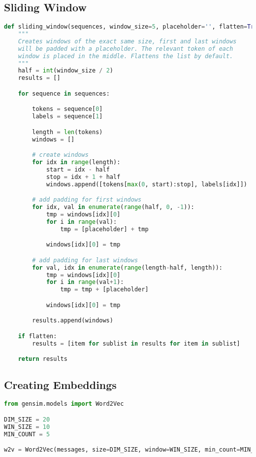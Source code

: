 \subsection{Sliding Window}

\begin{lstlisting}[language=Python, label={code:sliding-window}, caption=Sliding window implementation]
def sliding_window(sequences, window_size=5, placeholder='', flatten=True):
    """
    Creates windows of the exact same size, first and last windows
    will be padded with a placeholder. The relevant token of each
    window is placed in the middle. Flattens the list by default.
    """
    half = int(window_size / 2)
    results = []

    for sequence in sequences:

        tokens = sequence[0]
        labels = sequence[1]

        length = len(tokens)
        windows = []

        # create windows
        for idx in range(length):
            start = idx - half
            stop = idx + 1 + half
            windows.append([tokens[max(0, start):stop], labels[idx]])

        # add padding for first windows
        for idx, val in enumerate(range(half, 0, -1)):
            tmp = windows[idx][0]
            for i in range(val):
                tmp = [placeholder] + tmp

            windows[idx][0] = tmp

        # add padding for last windows
        for val, idx in enumerate(range(length-half, length)):
            tmp = windows[idx][0]
            for i in range(val+1):
                tmp = tmp + [placeholder]

            windows[idx][0] = tmp

        results.append(windows)

    if flatten:
        results = [item for sublist in results for item in sublist]

    return results
\end{lstlisting}

\subsection{Creating Embeddings}

\begin{lstlisting}[language=Python, label={code:embeddings}, caption=Creating custom embeddings]
from gensim.models import Word2Vec

DIM_SIZE = 20
WIN_SIZE = 10
MIN_COUNT = 5

w2v = Word2Vec(messages, size=DIM_SIZE, window=WIN_SIZE, min_count=MIN_COUNT, iter=10, workers=multiprocessing.cpu_count())
\end{lstlisting}

